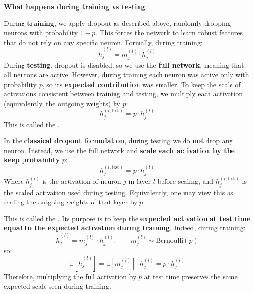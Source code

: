 \begin{flushleft}
    \textcolor{Green3}{ \textbf{What happens during training vs testing}}
\end{flushleft}
During \textbf{training}, we apply dropout as described above, randomly dropping neurons with probability $1-p$. This forces the network to learn robust features that do not rely on any specific neuron. Formally, during training:
\begin{equation*}
    \tilde{h}_j^{(l)} = m_j^{(l)} \cdot h_j^{(l)}
\end{equation*}
During \textbf{testing}, dropout is disabled, so we use the \textbf{full network}, meaning that all neurons are active. However, during training each neuron was active only with probability $p$, so its \textbf{expected contribution} was smaller. To keep the scale of activations consistent between training and testing, we multiply each activation (equivalently, the outgoing weights) by $p$:
\begin{equation*}
    h_j^{(l,\text{test})} = p \cdot h_j^{(l)}
\end{equation*}
This is called the .

\highspace
\begin{definitionbox}
    In the \textbf{classical dropout formulation}, during testing we do \textbf{not} drop any neuron. Instead, we use the full network and \textbf{scale each activation by the keep probability} $p$:
    \begin{equation}
        h_j^{(l,\text{test})} = p \cdot h_j^{(l)}
    \end{equation}
    Where $h_j^{(l)}$ is the activation of neuron $j$ in layer $l$ before scaling, and $h_j^{(l,\text{test})}$ is the scaled activation used during testing. Equivalently, one may view this as scaling the outgoing weights of that layer by $p$.

    \highspace
    This is called the . Its purpose is to keep the \textbf{expected activation at test time equal to the expected activation during training}. Indeed, during training:
    \begin{equation}
        \tilde{h}_j^{(l)} = m_j^{(l)} \cdot h_j^{(l)},
        \qquad m_j^{(l)} \sim \text{Bernoulli}(p)
    \end{equation}
    so:
    \begin{equation}
        \mathbb{E}\left[\tilde{h}_j^{(l)}\right]
        =
        \mathbb{E}\left[m_j^{(l)}\right] \cdot h_j^{(l)}
        =
        p \cdot h_j^{(l)}
    \end{equation}
    Therefore, multiplying the full activation by $p$ at test time preserves the same expected scale seen during training.
\end{definitionbox}

